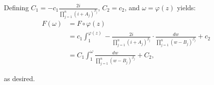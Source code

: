 \begin{solution}
  Defining $C_1 = -c_1 \frac{2 i}{\prod_{j=1}^n (i + A_j)^{\beta_j}}$, $C_2 = c_2$, and $\omega = \varphi(z)$ yields:
  \begin{align*}
  F(\omega) &= F \circ \varphi(z) \\
            &= c_1 \int_1^{\varphi(z)} -\frac{2 i }{\prod_{j=1}^n (i + A_j)^{\beta_j}} \cdot
                                        \frac{dw}{\prod_{j=1}^n \left( w - B_j \right)^{\beta_j}} + c_2 \\
            &= C_1 \int_1^{\omega} \frac{dw}{\prod_{j=1}^n \left( w - B_j \right)^{\beta_j}} + C_2,
  \end{align*}

  as desired. 
  \ \\
\end{solution}
